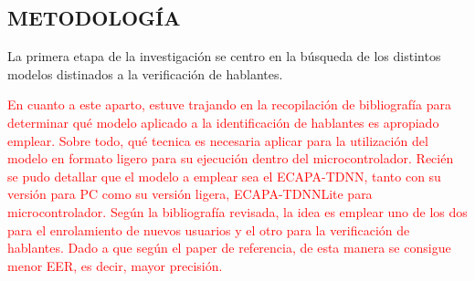 \subsection{METODOLOGÍA}

La primera etapa de la investigación se centro en la búsqueda de los distintos modelos distinados
a la verificación de hablantes. 

\textcolor{red}{En cuanto a este aparto, estuve trajando en la recopilación de bibliografía para determinar qué 
modelo aplicado a la identificación de hablantes es apropiado emplear. Sobre todo, qué tecnica es necesaria 
aplicar para la utilización del modelo en formato ligero para su ejecución dentro del microcontrolador.
Recién se pudo detallar que el modelo a emplear sea el ECAPA-TDNN, tanto con su versión para PC como su versión 
ligera, ECAPA-TDNNLite para microcontrolador. Según la bibliografía revisada, la idea es emplear uno de los dos para 
el enrolamiento de nuevos usuarios y el otro para la verificación de hablantes. Dado a que según el paper de referencia,
de esta manera se consigue menor EER, es decir, mayor precisión.
}
